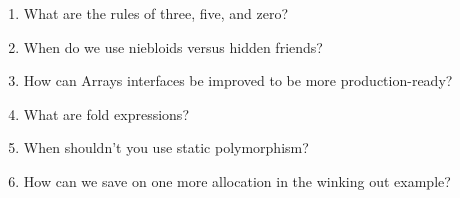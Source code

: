 \begin{enumerate}
\item
What are the rules of three, five, and zero?

\item
When do we use niebloids versus hidden friends?

\item
How can Arrays interfaces be improved to be more production-ready?

\item
What are fold expressions?

\item
When shouldn't you use static polymorphism?

\item
How can we save on one more allocation in the winking out example?
\end{enumerate}